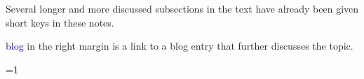 \documentclass{report}
\begin{document}
Several longer and more discussed subsections in the text have already
been given short keys in these notes.

\textcolor{blue}{blog} in the right margin is a link to a blog entry
that further discusses the topic.

\clearpage
{}

\Large

\def\basicStat{0}     %
\ifnum\basicStat=1




%
%
%
%
%
%
%
%
%
%
%
%
%
%
%
%
%
\else





















\fi

\dobib
\end{document}
